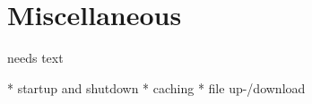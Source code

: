 \documentclass[a4paper,10pt,twoside]{book}
\begin{document}
\section{Miscellaneous}
needs text

  * startup and shutdown
  * caching
  * file up-/download
  

\ifx\wholebook\relax\else
   
   
\end{document}
